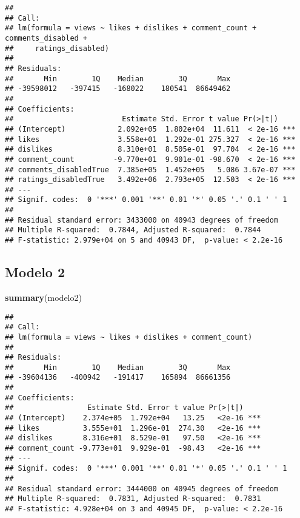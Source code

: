 \documentclass[]{article}
\newenvironment{Shaded}{\begin{snugshade}}{\end{snugshade}}
\newcommand{\KeywordTok}[1]{\textcolor[rgb]{0.13,0.29,0.53}{\textbf{#1}}}
\newcommand{\NormalTok}[1]{#1}
\begin{document}
\begin{verbatim}
## 
## Call:
## lm(formula = views ~ likes + dislikes + comment_count + comments_disabled + 
##     ratings_disabled)
## 
## Residuals:
##       Min        1Q    Median        3Q       Max 
## -39598012   -397415   -168022    180541  86649462 
## 
## Coefficients:
##                         Estimate Std. Error t value Pr(>|t|)    
## (Intercept)            2.092e+05  1.802e+04  11.611  < 2e-16 ***
## likes                  3.558e+01  1.292e-01 275.327  < 2e-16 ***
## dislikes               8.310e+01  8.505e-01  97.704  < 2e-16 ***
## comment_count         -9.770e+01  9.901e-01 -98.670  < 2e-16 ***
## comments_disabledTrue  7.385e+05  1.452e+05   5.086 3.67e-07 ***
## ratings_disabledTrue   3.492e+06  2.793e+05  12.503  < 2e-16 ***
## ---
## Signif. codes:  0 '***' 0.001 '**' 0.01 '*' 0.05 '.' 0.1 ' ' 1
## 
## Residual standard error: 3433000 on 40943 degrees of freedom
## Multiple R-squared:  0.7844, Adjusted R-squared:  0.7844 
## F-statistic: 2.979e+04 on 5 and 40943 DF,  p-value: < 2.2e-16
\end{verbatim}

\hypertarget{modelo-2}{%
\subsection{Modelo 2}\label{modelo-2}}

\begin{Shaded}
\begin{Highlighting}[]
  \KeywordTok{summary}\NormalTok{(modelo2)}
\end{Highlighting}
\end{Shaded}

\begin{verbatim}
## 
## Call:
## lm(formula = views ~ likes + dislikes + comment_count)
## 
## Residuals:
##       Min        1Q    Median        3Q       Max 
## -39604136   -400942   -191417    165894  86661356 
## 
## Coefficients:
##                 Estimate Std. Error t value Pr(>|t|)    
## (Intercept)    2.374e+05  1.792e+04   13.25   <2e-16 ***
## likes          3.555e+01  1.296e-01  274.30   <2e-16 ***
## dislikes       8.316e+01  8.529e-01   97.50   <2e-16 ***
## comment_count -9.773e+01  9.929e-01  -98.43   <2e-16 ***
## ---
## Signif. codes:  0 '***' 0.001 '**' 0.01 '*' 0.05 '.' 0.1 ' ' 1
## 
## Residual standard error: 3444000 on 40945 degrees of freedom
## Multiple R-squared:  0.7831, Adjusted R-squared:  0.7831 
## F-statistic: 4.928e+04 on 3 and 40945 DF,  p-value: < 2.2e-16
\end{verbatim}
\end{document}
